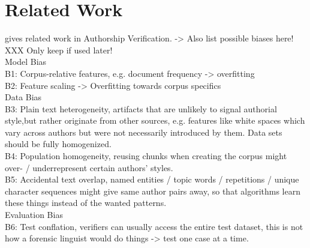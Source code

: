 \chapter{Related Work}\label{related_work}


\cite{stein2019unbiasedGutenbergCorpus} gives related work in Authorship Verification.
-> Also list possible biases here! XXX Only keep if used later!\\
Model Bias\\
B1: Corpus-relative features, e.g. document frequency -> overfitting\\
B2: Feature scaling -> Overfitting towards corpus specifics\\
Data Bias\\
B3: Plain text heterogeneity, artifacts that are unlikely to signal authorial style,but rather originate from other sources, e.g. features like white spaces which vary across authors but were not necessarily introduced by them. Data sets should be fully homogenized.\\
B4: Population homogeneity, reusing chunks when creating the corpus might over- / underrepresent certain authors' styles.\\
B5: Accidental text overlap, named entities / topic words / repetitions / unique character sequences might give same author pairs away, so that algorithms learn these things instead of the wanted patterns.\\
Evaluation Bias\\
B6: Test conflation, verifiers can usually access the entire test dataset, this is not how a forensic linguist would do things -> test one case at a time.\\
